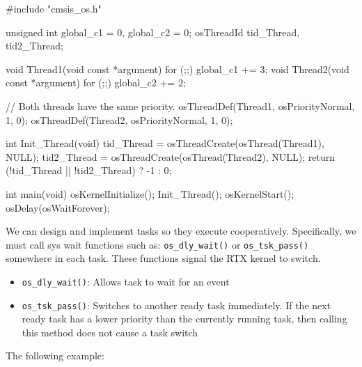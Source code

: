 \documentclass[a4paper,11pt]{article}
\newcommand{\code}[1]{\texttt{#1}}
\begin{document}
\begin{minipage}{\linewidth}
\begin{notecode}[language=C,basicstyle=\fontsize{9.5}{11}\selectfont\ttfamily\color{NoteInk}]
#include "cmsis_os.h"

unsigned int global_c1 = 0, global_c2 = 0;
osThreadId tid_Thread, tid2_Thread;

void Thread1(void const *argument) {
    for (;;) global_c1 += 3;
}
void Thread2(void const *argument) {
    for (;;) global_c2 += 2;
}

// Both threads have the same priority.
osThreadDef(Thread1, osPriorityNormal, 1, 0);
osThreadDef(Thread2, osPriorityNormal, 1, 0);

int Init_Thread(void) {
    tid_Thread  = osThreadCreate(osThread(Thread1), NULL);
    tid2_Thread = osThreadCreate(osThread(Thread2), NULL);
    return (!tid_Thread || !tid2_Thread) ? -1 : 0;
}

int main(void) {
    osKernelInitialize();
    Init_Thread();
    osKernelStart();
    osDelay(osWaitForever);
}
\end{notecode}
\end{minipage}

\Needspace{140pt}



We can design and implement tasks so they execute cooperatively. Specifically, we must call sys wait functions such as: \code{os\_dly\_wait()} or \code{os\_tsk\_pass()} somewhere in each task. These functions signal the RTX kernel to switch.\par

\Needspace{64pt}
\begin{itemize}
\item \code{os\_dly\_wait()}: Allows task to wait for an event
\item \code{os\_tsk\_pass()}: Switches to another ready task immediately. If the next ready task has a lower priority than the currently running task, then calling this method does not cause a task switch 
\end{itemize}



\Needspace{100pt}
The following example:\par
\end{document}
